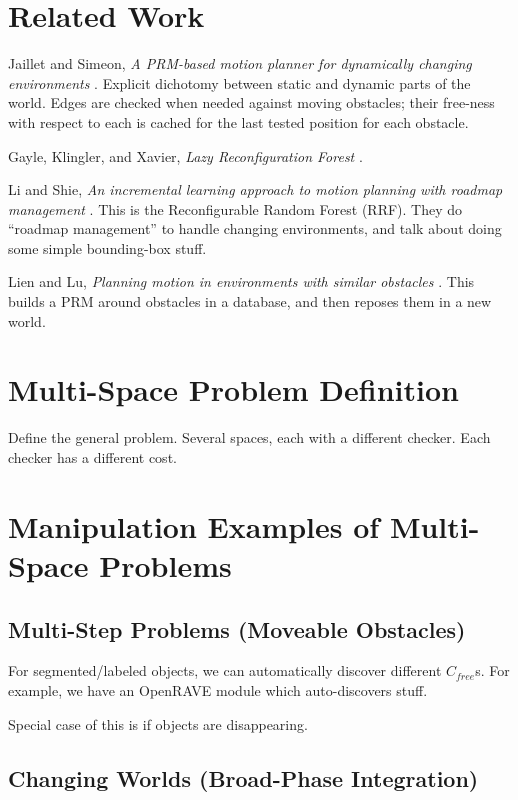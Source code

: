 \documentclass{report}
\begin{document}
\section{Related Work}

Jaillet and Simeon,
\emph{A PRM-based motion planner for dynamically changing environments}
\cite{jaillet2004dynamicprm}.
Explicit dichotomy between static and dynamic parts of the world.
Edges are checked when needed against moving obstacles;
their free-ness with respect to each is cached for the last tested position
for each obstacle.

Gayle, Klingler, and Xavier,
\emph{Lazy Reconfiguration Forest}
\cite{gayle2007lazyreconfigforest}.

Li and Shie,
\emph{An incremental learning approach to motion planning with
      roadmap management}
\cite{li2002incrementalprmmanagement}.
This is the Reconfigurable Random Forest (RRF).
They do ``roadmap management'' to handle changing environments,
and talk about doing some simple bounding-box stuff.

Lien and Lu,
\emph{Planning motion in environments with similar obstacles}
\cite{lien2009similarobstacles}.
This builds a PRM around obstacles in a database,
and then reposes them in a new world.

\section{Multi-Space Problem Definition}

Define the general problem.
Several spaces, each with a different checker.
Each checker has a different cost.

\section{Manipulation Examples of Multi-Space Problems}

\subsection{Multi-Step Problems (Moveable Obstacles)}

For segmented/labeled objects, we can automatically discover
different $C_{free}$s.
For example, we have an OpenRAVE module
which auto-discovers stuff.

Special case of this is if objects are disappearing.

\subsection{Changing Worlds (Broad-Phase Integration)}
\end{document}
